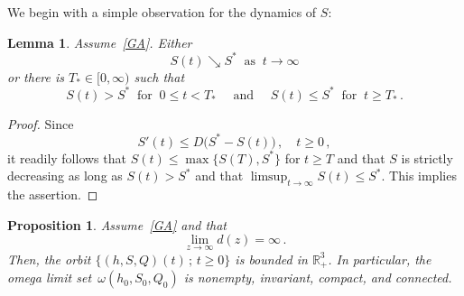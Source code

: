 \documentclass[reqno,11pt]{amsart}
\newtheorem{lem}[thm]{Lemma}
\newtheorem{prop}[thm]{Proposition}
\numberwithin{equation}{section}
\newcommand{\R}{\mathbb{R}}
\begin{document}
We begin with a simple observation for the dynamics of $S$:

\begin{lem}\label{C0}
Assume~\eqref{GA}. Either 
\begin{equation}\label{S*}
S(t)\searrow S^* \ \text{ as }\ t\to\infty
\end{equation}
or there is $T_*\in[0,\infty)$ such that
\begin{equation}\label{T*}
S(t)> S^* \ \text{ for }\ 0\le t<T_* \quad \text{ and }\quad S(t)\le S^* \ \text{ for }\ t\ge T_*\,.
\end{equation}
\end{lem}

\begin{proof}
Since
$$
S'(t)\le D\big(S^*-S(t)\big)\,,\quad t\ge 0\,,
$$
it readily follows that $S(t)\le \max\{S(T),S^*\}$ for $t\ge T$ and that $S$ is strictly decreasing as long as $S(t)>S^*$ and that $\limsup_{t\to\infty} S(t)\le S^*$. This implies the assertion.
\end{proof}



\begin{prop}\label{PX}
Assume~\eqref{GA} and that 
\begin{equation}\label{hinfty}
\lim_{z\to\infty}d(z)=\infty\,.
\end{equation}
Then, the orbit $\{(h,S,Q)(t)\,;\, t\ge 0\}$ is bounded in $\R_+^3$. In particular, the omega limit set~$\omega(h_0,S_0,Q_0)$ is nonempty, invariant,  compact, and connected.
\end{prop}
\end{document}

